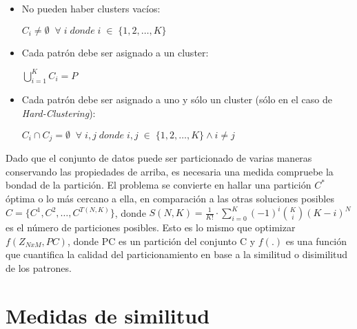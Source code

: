 \begin{itemize} 
\label{en:properties}

\item No pueden haber clusters vacíos:

$ C_i \neq \emptyset \;\; \forall\; i\; donde\; i\; \in\; \{1, 2, \dots, K\} $

\item Cada patrón debe ser asignado a un cluster:

$\bigcup_{i=1}^{K} C_i = P$

\item Cada patrón debe ser asignado a uno y sólo un cluster (sólo en el caso de
\emph{Hard-Clustering}):

$ C_i \cap C_j = \emptyset \;\; \forall\; i,j\; donde\; i,j\; \in \; \{1, 2, \dots, K\} \land i \neq j  $
\end{itemize}

Dado que el conjunto de datos puede ser particionado de varias maneras
conservando las propiedades de arriba, es necesaria 
una medida compruebe la bondad de la partición. El problema se convierte en hallar
una partición $C^*$ óptima o lo más cercano a ella, en comparación a 
las otras soluciones posibles $C = \{ C^1, C^2, \dots, C^{T(N,K)} \}$, donde 
$S(N,K) = { {\displaystyle\frac{1}{K!}} \cdot {\displaystyle\sum_{i=0}^{K} (-1)^i  \binom{K}{i} (K-i)^N} }$
es el número de particiones posibles. Esto es lo mismo que optimizar $f(Z_{NxM}, PC)$,
donde PC es un partición del conjunto C y $f(.)$ es una función que
cuantifica la calidad del particionamiento en base a la similitud o disimilitud
de los patrones.

\section{Medidas de similitud} 
\label{sect:mdist}

